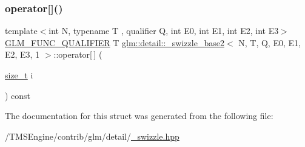 \subsubsection{\texorpdfstring{operator[]()}{operator[]()}}
{\footnotesize\ttfamily template$<$int N, typename T , qualifier Q, int E0, int E1, int E2, int E3$>$ \\
\hyperlink{setup_8hpp_a33fdea6f91c5f834105f7415e2a64407}{G\+L\+M\+\_\+\+F\+U\+N\+C\+\_\+\+Q\+U\+A\+L\+I\+F\+I\+ER} T \hyperlink{structglm_1_1detail_1_1__swizzle__base2}{glm\+::detail\+::\+\_\+swizzle\+\_\+base2}$<$ N, T, Q, E0, E1, E2, E3, 1 $>$\+::operator\mbox{[}$\,$\mbox{]} (\begin{DoxyParamCaption}\item[{\hyperlink{_s_d_l__config__winrt_8h_a7c94ea6f8948649f8d181ae55911eeaf}{size\+\_\+t}}]{i }\end{DoxyParamCaption}) const\hspace{0.3cm}{\ttfamily [inline]}}



The documentation for this struct was generated from the following file\+:\begin{DoxyCompactItemize}
\item 
/\+T\+M\+S\+Engine/contrib/glm/detail/\hyperlink{__swizzle_8hpp}{\+\_\+swizzle.\+hpp}\end{DoxyCompactItemize}
